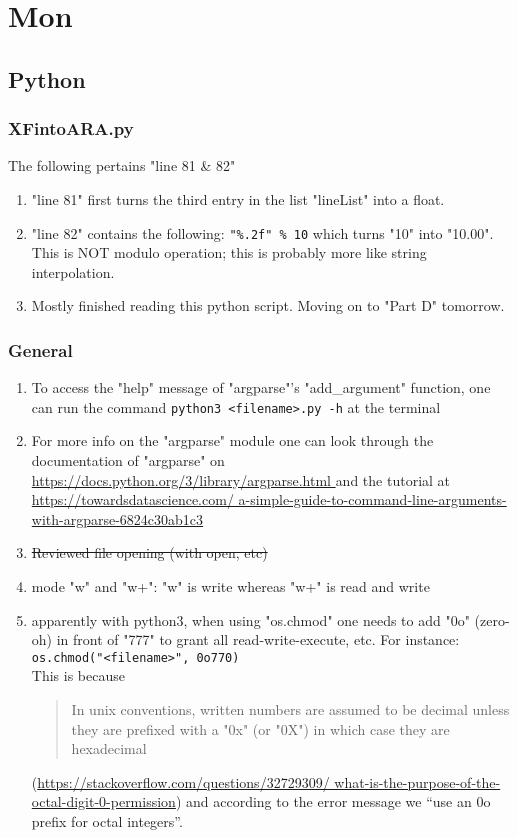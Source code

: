 \documentclass[12pt,letterpaper]{article}
\begin{document}
\newpage
\setcounter{section}{11}

\section{Mon}
\subsection{Python}
\subsubsection{XFintoARA.py}
The following pertains "line 81 \& 82"
\begin{enumerate}
  \item "line 81" first turns the third entry in the list "lineList" into a float.
  \item "line 82" contains the following: \verb|"%.2f" % 10| which turns "10"
    into "10.00". This is NOT modulo operation; this is probably more like string 
    interpolation.
  \item Mostly finished reading this python script. Moving on to "Part D" tomorrow.

\end{enumerate}
\subsubsection{General}
\begin{enumerate}
  \item To access the "help" message of "argparse"'s "add_argument" function,
    one can run the command \verb|python3 <filename>.py -h| at the terminal
  \item For more info on the "argparse" module one can look through the
    documentation of "argparse" on \url{
      https://docs.python.org/3/library/argparse.html 
    } and the tutorial at \url{
      https://towardsdatascience.com/
      a-simple-guide-to-command-line-arguments-with-argparse-6824c30ab1c3
    }
  \item \st{Reviewed file opening (with open, etc)}
  \item mode "w" and "w+": "w" is write whereas "w+" is read and write
  \item apparently with python3, when using "os.chmod" one needs to add "0o" (zero-oh)
    in front of "777" to grant all read-write-execute, etc. For instance:\\
    \verb|os.chmod("<filename>", 0o770)|\\
    This is because
    \begin{quote}
      In unix conventions, written numbers are assumed to be decimal unless they are 
      prefixed with a "0x" (or "0X") in which case they are hexadecimal 
    \end{quote}
    (\url{https://stackoverflow.com/questions/32729309/
    what-is-the-purpose-of-the-octal-digit-0-permission})
    and according to the error message we ``use an 0o prefix for octal integers''.
\end{enumerate}
\end{document}

